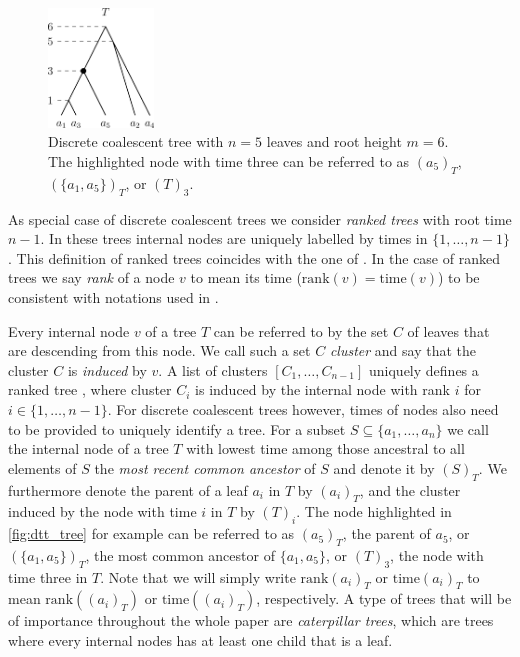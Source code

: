 \documentclass[11pt]{amsart}
\newcommand{\rank}{\mathrm{rank}}
\newcommand{\ntime}{\mathrm{time}}
\begin{document}
\begin{figure}[ht]
	\includegraphics[width=0.25\textwidth]{dtt_tree.eps}
	\caption{Discrete coalescent tree with $n = 5$ leaves and root height $m = 6$.
	The highlighted node with time three can be referred to as $(a_5)_T$, $(\{a_1,a_5\})_T$, or $(T)_3$.}
	\label{fig:dtt_tree}
\end{figure}

As special case of discrete coalescent trees we consider \emph{ranked trees} with root time $n-1$.
In these trees internal nodes are uniquely labelled by times in $\{1, \ldots, n-1\}$.
This definition of ranked trees coincides with the one of \textcite{Collienne2020-iu}.
In the case of ranked trees we say \emph{rank} of a node $v$ to mean its time ($\rank(v) = \ntime(v)$) to be consistent with notations used in \autocite{Collienne2020-iu}.

Every internal node $v$ of a tree $T$ can be referred to by the set $C$ of leaves that are descending from this node.
We call such a set $C$ \emph{cluster} and say that the cluster $C$ is \emph{induced} by $v$.
A list of clusters $[C_1, \ldots, C_{n-1}]$ uniquely defines a ranked tree \autocite{Collienne2020-iu}, where cluster $C_i$ is induced by the internal node with rank $i$ for $i \in \{1, \ldots, n-1\}$.
For discrete coalescent trees however, times of nodes also need to be provided to uniquely identify a tree.
For a subset $S \subseteq \{a_1, \ldots, a_n\}$ we call the internal node of a tree $T$ with lowest time among those ancestral to all elements of $S$ the \emph{most recent common ancestor} of $S$ and denote it by $(S)_T$.
We furthermore denote the parent of a leaf $a_i$ in $T$ by $(a_i)_T$, and the cluster induced by the node with time $i$ in $T$ by $(T)_i$.
The node highlighted in \autoref{fig:dtt_tree} for example can be referred to as $(a_5)_T$, the parent of $a_5$, or $(\{a_1, a_5\})_T$, the most common ancestor of $\{a_1, a_5\}$, or $(T)_3$, the node with time three in $T$.
Note that we will simply write $\rank(a_i)_T$ or $\ntime(a_i)_T$ to mean $\rank((a_i)_T)$ or $\ntime((a_i)_T)$, respectively.
A type of trees that will be of importance throughout the whole paper are \emph{caterpillar trees}, which are trees where every internal nodes has at least one child that is a leaf.
\end{document}
